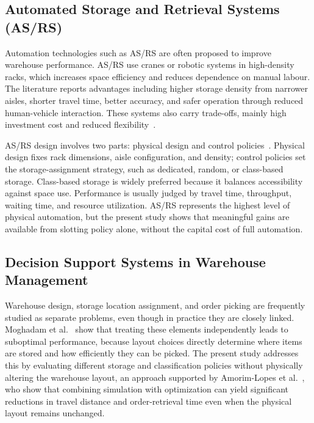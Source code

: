 \documentclass[12pt,a4paper]{article}
\begin{document}
\subsection{Automated Storage and Retrieval Systems (AS/RS)}
Automation technologies such as AS/RS are often proposed to improve warehouse
performance. AS/RS use cranes or robotic systems in high-density racks, which
increases space efficiency and reduces dependence on manual labour. The
literature reports advantages including higher storage density from narrower
aisles, shorter travel time, better accuracy, and safer operation through
reduced human-vehicle interaction. These systems also carry trade-offs,
mainly high investment cost and reduced flexibility~\cite{roodbergen2009}.

AS/RS design involves two parts: physical design and control
policies~\cite{roodbergen2009}. Physical design fixes rack dimensions, aisle
configuration, and density; control policies set the storage-assignment
strategy, such as dedicated, random, or class-based storage. Class-based
storage is widely preferred because it balances accessibility against space
use. Performance is usually judged by travel time, throughput, waiting time,
and resource utilization. AS/RS represents the highest level of physical
automation, but the present study shows that meaningful gains are available
from slotting policy alone, without the capital cost of full automation.

\subsection{Decision Support Systems in Warehouse Management}
Warehouse design, storage location assignment, and order picking are
frequently studied as separate problems, even though in practice they are
closely linked. Moghadam et al.~\cite{moghadam2025} show that treating these
elements independently leads to suboptimal performance, because layout choices
directly determine where items are stored and how efficiently they can be
picked. The present study addresses this by evaluating different storage and
classification policies without physically altering the warehouse layout, an
approach supported by Amorim-Lopes et al.~\cite{amorim2021}, who show that
combining simulation with optimization can yield significant reductions in
travel distance and order-retrieval time even when the physical layout remains
unchanged.
\end{document}
